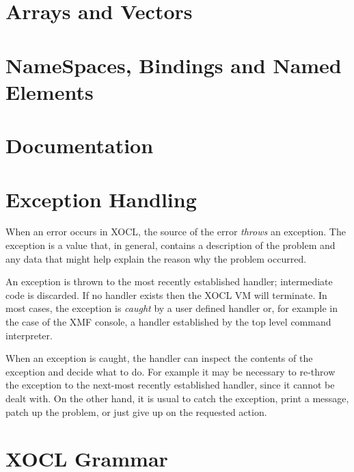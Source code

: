 \documentclass{article}
\begin{document}
      

\section{Arrays and Vectors}

\section{NameSpaces, Bindings and Named Elements}

\section{Documentation}

\section{Exception Handling}

When an error occurs in XOCL, the source of the error {\em throws} an exception. The exception is a value
that, in general, contains a description of the problem and any data that might help explain the
reason why the problem occurred. 

An exception is thrown to the most recently established handler; intermediate code is discarded. If
no handler exists then the XOCL VM will terminate. In most cases, the exception is {\em caught} by a user
defined handler or, for example in the case of the XMF console, a handler established by the top
level command interpreter.

When an exception is caught, the handler can inspect the contents of the exception and decide what to do.
For example it may be necessary to re-throw the exception to the next-most recently established handler,
since it cannot be dealt with. On the other hand, it is usual to catch the exception, print a message,
patch up the problem, or just give up on the requested action.

\appendix

\section{XOCL Grammar}
\end{document}
